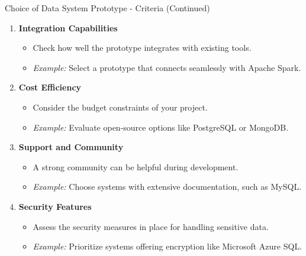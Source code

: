\documentclass[aspectratio=169]{beamer}
\begin{document}
\begin{frame}[fragile]{Choice of Data System Prototype - Criteria (Continued)}
  \begin{enumerate}[resume]
    \item \textbf{Integration Capabilities}
    \begin{itemize}
      \item Check how well the prototype integrates with existing tools.
      \item \textit{Example:} Select a prototype that connects seamlessly with Apache Spark.
    \end{itemize}

    \item \textbf{Cost Efficiency}
    \begin{itemize}
      \item Consider the budget constraints of your project.
      \item \textit{Example:} Evaluate open-source options like PostgreSQL or MongoDB.
    \end{itemize}

    \item \textbf{Support and Community}
    \begin{itemize}
      \item A strong community can be helpful during development.
      \item \textit{Example:} Choose systems with extensive documentation, such as MySQL.
    \end{itemize}

    \item \textbf{Security Features}
    \begin{itemize}
      \item Assess the security measures in place for handling sensitive data.
      \item \textit{Example:} Prioritize systems offering encryption like Microsoft Azure SQL.
    \end{itemize}
  \end{enumerate}
\end{frame}
\end{document}
